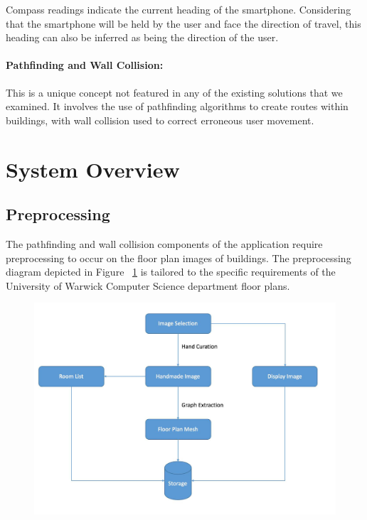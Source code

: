 \documentclass[12pt,a4paper]{report}
\begin{document}
Compass readings indicate the current heading of the smartphone. Considering that the smartphone will be held by the user and face the direction of travel, this heading can also be inferred as being the direction of the user.

\paragraph{Pathfinding and Wall Collision:}
This is a unique concept not featured in any of the existing solutions that we examined. It involves the use of pathfinding algorithms to create routes within buildings, with wall collision used to correct erroneous user movement. 

\section{System Overview}

\subsection{Preprocessing}

The pathfinding and wall collision components of the application require preprocessing to occur on the floor plan images of buildings. The preprocessing diagram depicted in Figure ~\ref{fig:preFlow} is tailored to the specific requirements of the University of Warwick Computer Science department floor plans.

\begin{figure}[h]
\includegraphics[width=\textwidth]{images/preFlow.png}
\label{fig:preFlow}
\end{figure}
\end{document}
